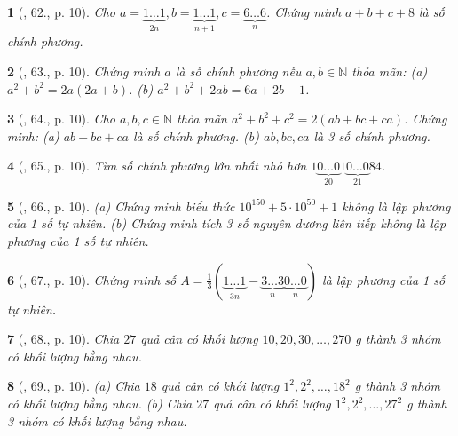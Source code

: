 \documentclass{article}
\newtheorem{baitoan}{}
\begin{document}
\begin{baitoan}[\cite{Binh_Toan_8_tap_1}, 62., p. 10]
	Cho $a = \underbrace{1\ldots1}_{2n},b = \underbrace{1\ldots1}_{n+1},c = \underbrace{6\ldots6}_n$. Chứng minh $a + b + c + 8$ là số chính phương.
\end{baitoan}

\begin{baitoan}[\cite{Binh_Toan_8_tap_1}, 63., p. 10]
	Chứng minh $a$ là số chính phương nếu $a,b\in\mathbb{N}$ thỏa mãn: (a) $a^2 + b^2 = 2a(2a + b)$. (b) $a^2 + b^2 + 2ab = 6a + 2b - 1$.
\end{baitoan}

\begin{baitoan}[\cite{Binh_Toan_8_tap_1}, 64., p. 10]
	Cho $a,b,c\in\mathbb{N}$ thỏa mãn $a^2 + b^2 + c^2 = 2(ab + bc + ca)$. Chứng minh: (a) $ab + bc + ca$ là số chính phương. (b) $ab,bc,ca$ là 3 số chính phương.
\end{baitoan}

\begin{baitoan}[\cite{Binh_Toan_8_tap_1}, 65., p. 10]
	Tìm số chính phương lớn nhất nhỏ hơn $1\underbrace{0\ldots0}_{20}1\underbrace{0\ldots0}_{21}84$.
\end{baitoan}

\begin{baitoan}[\cite{Binh_Toan_8_tap_1}, 66., p. 10]
	(a) Chứng minh biểu thức $10^{150} + 5\cdot10^{50} + 1$ không là lập phương của 1 số tự nhiên. (b) Chứng minh tích 3 số nguyên dương liên tiếp không là lập phương của 1 số tự nhiên.
\end{baitoan}

\begin{baitoan}[\cite{Binh_Toan_8_tap_1}, 67., p. 10]
	Chứng minh số $A = \frac{1}{3}\left(\underbrace{1\ldots1}_{3n} - \underbrace{3\ldots3}_n\underbrace{0\ldots0}_n\right)$ là lập phương của 1 số tự nhiên.
\end{baitoan}

\begin{baitoan}[\cite{Binh_Toan_8_tap_1}, 68., p. 10]
	Chia $27$ quả cân có khối lượng $10,20,30,\ldots,270$ {\rm g} thành 3 nhóm có khối lượng bằng nhau.
\end{baitoan}

\begin{baitoan}[\cite{Binh_Toan_8_tap_1}, 69., p. 10]
	(a) Chia $18$ quả cân có khối lượng $1^2,2^2,\ldots,18^2$ {\rm g} thành 3 nhóm có khối lượng bằng nhau. (b) Chia $27$ quả cân có khối lượng $1^2,2^2,\ldots,27^2$ {\rm g} thành 3 nhóm có khối lượng bằng nhau.
\end{baitoan}
\end{document}
